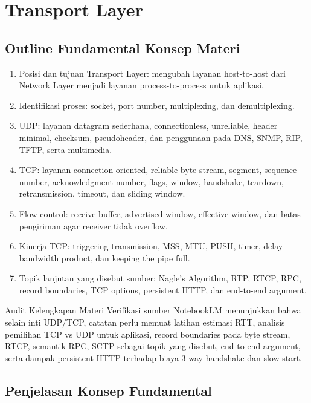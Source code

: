 \section{Transport Layer}

\subsection{Outline Fundamental Konsep Materi}

\begin{enumerate}
    \item Posisi dan tujuan Transport Layer: mengubah layanan host-to-host dari Network Layer menjadi layanan process-to-process untuk aplikasi.
    \item Identifikasi proses: socket, port number, multiplexing, dan demultiplexing.
    \item UDP: layanan datagram sederhana, connectionless, unreliable, header minimal, checksum, pseudoheader, dan penggunaan pada DNS, SNMP, RIP, TFTP, serta multimedia.
    \item TCP: layanan connection-oriented, reliable byte stream, segment, sequence number, acknowledgment number, flags, window, handshake, teardown, retransmission, timeout, dan sliding window.
    \item Flow control: receive buffer, advertised window, effective window, dan batas pengiriman agar receiver tidak overflow.
    \item Kinerja TCP: triggering transmission, MSS, MTU, PUSH, timer, delay-bandwidth product, dan keeping the pipe full.
    \item Topik lanjutan yang disebut sumber: Nagle's Algorithm, RTP, RTCP, RPC, record boundaries, TCP options, persistent HTTP, dan end-to-end argument.
\end{enumerate}

\begin{cmt}{Audit Kelengkapan Materi}{}
Verifikasi sumber NotebookLM menunjukkan bahwa selain inti UDP/TCP, catatan perlu memuat latihan estimasi RTT, analisis pemilihan TCP vs UDP untuk aplikasi, record boundaries pada byte stream, RTCP, semantik RPC, SCTP sebagai topik yang disebut, end-to-end argument, serta dampak persistent HTTP terhadap biaya 3-way handshake dan slow start.
\end{cmt}

\subsection{Penjelasan Konsep Fundamental}

